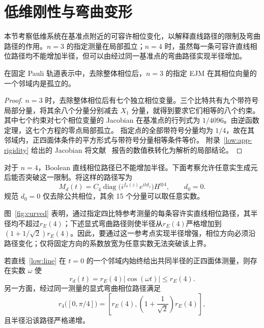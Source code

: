 \section{低维刚性与弯曲变形}
\label{low:section}

本节考察低维系统在基准点附近的可容许相位变化，以解释直线路径的限制及弯曲路径的作用。$n=3$ 的指定测量在局部孤立；$n=4$ 时，虽然每一条可容许直线相位路径均不能增加半径，但可以由经过同一基准点的弯曲路径实现半径增加。

\begin{proposition}[$n=3$ 时的局部刚性]
\label{low:rigidity}
在固定 Pauli 轨道表示中，去除整体相位后，$n=3$ 的指定 EJM 在其相位向量的一个邻域内是孤立的。
\end{proposition}

\begin{proof}
$n=3$ 时，去除整体相位后有七个独立相位变量。三个比特共有九个带符号局部分量，将其余八个分量分别减去 $X_1$ 分量，就得到要求它们相等的八个约束。其中七个约束对七个相位变量的 Jacobian 在基准点的行列式为
$1/4096$。由逆函数定理，这七个方程的零点局部孤立。
指定点的全部带符号分量均为 $1/4$，故在其邻域内，正四面体条件的平方形式与带符号分量相等条件等价。
附录~\ref{low:app-rigidity} 给出的 Jacobian 将文献~\cite{PauwelsGisin2026}
报告的数值秩转化为解析的局部结论。
\end{proof}

对于 $n=4$，Boolean 直线相位路径已不能增加半径。下面考察允许任意实生成元后能否突破这一限制。将这样的路径写为
\begin{equation}
 M_d(t)=C_4\operatorname{diag}
 \bigl(i^{f_0(z)}e^{itd_z}\bigr)H^{\otimes4},\qquad d_0=0.
 \label{low:line}
\end{equation}
规范 $d_0=0$ 仅去除公共相位，其余 15 个分量可以取任意实数。

图~\ref{fig:curved} 表明，通过指定四比特参考测量的每条容许实直线相位路径，其半径均不超过$r_E(4)$；下述显式弯曲路径则使半径从$r_E(4)$严格增加到$(1+1/\sqrt2)r_E(4)$。因此，要通过这一参考点实现半径增强，相位方向必须沿路径变化；仅将固定方向的系数放宽为任意实数无法突破该上界。

\begin{theorem}[$n=4$ 时的直线限制与弯曲路径]
\label{low:theorem}
若直线~\eqref{low:line} 在 $t=0$ 的一个邻域内始终给出共同半径的正四面体测量，则存在实数 $\omega$ 使
\begin{equation}
 r_d(t)=r_E(4)|\cos(\omega t)|\le r_E(4).
 \label{low:line-bound}
\end{equation}
另一方面，经过同一测量的显式弯曲相位路径满足
\begin{equation}
 r_4\bigl([0,\pi/4]\bigr)
 =\left[r_E(4),\left(1+\frac1{\sqrt2}\right)r_E(4)\right],
 \label{low:curve-range}
\end{equation}
且半径沿该路径严格递增。
\end{theorem}


